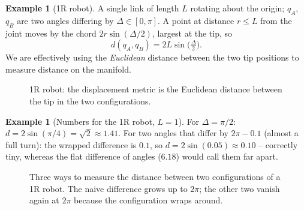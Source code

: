 \documentclass[11pt,a4paper]{article}
\newcommand{\Sph}{\mathbb{S}}
\theoremstyle{definition}
\newtheorem{example}[definition]{Example}
\theoremstyle{plain}
\theoremstyle{remark}
\begin{document}
\begin{example}[1R robot]
A single link of length $L$ rotating about the origin; $q_A$, $q_B$ are two angles differing by $\Delta\in[0,\pi]$. A point at distance $r\le L$ from the joint moves by the chord $2r\sin(\Delta/2)$, largest at the tip, so
\[
  d(q_A,q_B)=2L\sin\!\big(\tfrac{\Delta}{2}\big).
\]
We are effectively using the \emph{Euclidean} distance between the two tip positions to measure distance on the manifold.
\end{example}

\begin{figure}[ht]
\centering
{}
\caption{1R robot: the displacement metric is the Euclidean distance between the tip in the two configurations.}
\end{figure}

\begin{example}[Numbers for the 1R robot, $L=1$]
For $\Delta=\pi/2$: $d=2\sin(\pi/4)=\sqrt2\approx1.41$. For two angles that differ by $2\pi-0.1$ (almost a full turn): the wrapped difference is $0.1$, so $d=2\sin(0.05)\approx0.10$ -- correctly tiny, whereas the flat difference of angles ($6.18$) would call them far apart.
\end{example}

\begin{figure}[ht]
\centering
{}
\caption{Three ways to measure the distance between two configurations of a 1R robot. The naive difference grows up to $2\pi$; the other two vanish again at $2\pi$ because the configuration wraps around.}
\end{figure}
\end{document}
